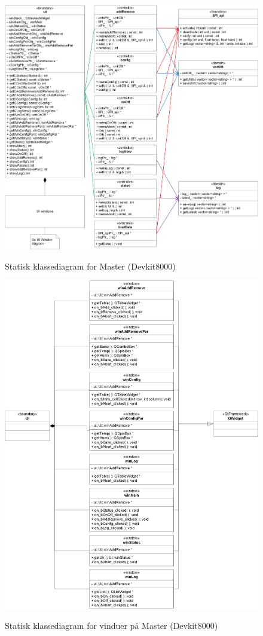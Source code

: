 
\begin{figure}[!htbp] \centering
{\includegraphics[scale=0.7]{filer/implementering/sw_class_devkit_static}}
\caption{Statisk klassediagram for Master (Devkit8000)}
\label{fig:class_static_dev}
\end{figure}

\begin{figure}[!htbp] \centering
{\includegraphics[scale=0.7]{filer/implementering/sw_class_devkit_windows_static}}
\caption{Statisk klassediagram for vinduer på Master (Devkit8000)}
\label{fig:class_static_dev_window}
\end{figure}
